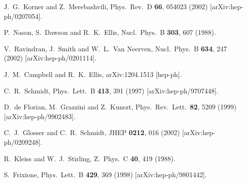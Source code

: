 \documentclass[12pt]{article}
\begin{document}
\begin{thebibliography}{99}
  J.~G.~Korner and Z.~Merebashvili,
  Phys.\ Rev.\  D {\bf 66}, 054023 (2002)
  [arXiv:hep-ph/0207054].

P.~Nason, S.~Dawson and R.~K.~Ellis,
Nucl.\ Phys.\ B {\bf 303}, 607 (1988).

V.~Ravindran, J.~Smith and W.~L.~Van Neerven,
Nucl.\ Phys.\ B {\bf 634}, 247 (2002)
[arXiv:hep-ph/0201114].

  J.~M.~Campbell and R.~K.~Ellis,
  arXiv:1204.1513 [hep-ph].

C.~R.~Schmidt,
Phys.\ Lett.\ B {\bf 413}, 391 (1997)
[arXiv:hep-ph/9707448].

D.~de Florian, M.~Grazzini and Z.~Kunszt,
Phys.\ Rev.\ Lett.\  {\bf 82}, 5209 (1999)
[arXiv:hep-ph/9902483].

C.~J.~Glosser and C.~R.~Schmidt,
JHEP {\bf 0212}, 016 (2002)
[arXiv:hep-ph/0209248].

R.~Kleiss and W.~J.~Stirling,
Z.\ Phys.\ C {\bf 40}, 419 (1988).

  S.~Frixione,
  Phys.\ Lett.\  B {\bf 429}, 369 (1998)
  [arXiv:hep-ph/9801442].


\end{thebibliography}
\end{document}
